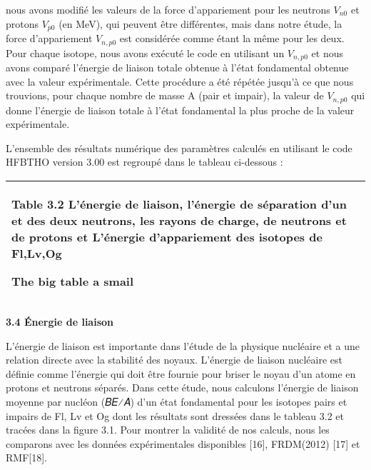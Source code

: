 \documentclass[a4paper]{article}
\begin{document}
nous avons modifié les valeurs de la force d'appariement pour les neutrons  $V_{n0}$ et protons  $V_{p0}$ (en MeV), qui peuvent être différentes, mais dans notre étude, la force d'appariement  $V_{n,p0}$  est considérée comme étant la même pour les deux. Pour chaque isotope, nous avons exécuté le code en utilisant un  $V_{n,p0}$  et  nous avons comparé l'énergie de liaison totale obtenue à l'état fondamental obtenue avec la valeur expérimentale. Cette procédure a été répétée jusqu'à ce que nous trouvions, pour chaque nombre de masse A (pair et impair), la valeur de  $V_{n,p0}$  qui donne l'énergie de liaison totale à l'état fondamental la plus proche de la valeur expérimentale.

 L’ensemble des résultats numérique des paramètres calculés en utilisant le code HFBTHO version 3.00  est regroupé dans le tableau ci-dessous :

\begin{flushleft}
\tablefirsthead{}
\tablehead{}
\tabletail{}
\tablelasttail{}
\begin{supertabular}{|m{5.78026in}|}
\hline
{\begin{french} \textbf{  Table 3.2 }L'énergie de liaison, l'énergie de séparation d’un et des deux neutrons, les rayons de charge, de neutrons et de protons et L’énergie d’appariement des isotopes de Fl,Lv,Og\end{french}}

{\bfseries  \textenglish{The big table a smail}}\\\hline
\end{supertabular}
\end{flushleft}
\textenglish{\textbf{ }}\textbf{3.4 Énergie de liaison}

 L'énergie de liaison est importante dans l'étude de la physique nucléaire et a une relation directe avec la stabilité des noyaux. L'énergie de liaison nucléaire est définie comme l'énergie qui doit être fournie pour briser le noyau d'un atome en protons et neutrons séparés. Dans cette étude, nous calculons l'énergie de liaison moyenne par nucléon (𝐵𝐸⁄𝐴) d'un état fondamental pour les isotopes pairs et impairs de Fl, Lv et Og  dont les résultats sont dressées dans le tableau 3.2 et tracées dans la figure 3.1. Pour montrer la validité de nos calculs, nous les comparons avec les données expérimentales disponibles [16], FRDM(2012) [17] et RMF[18].
\end{document}
